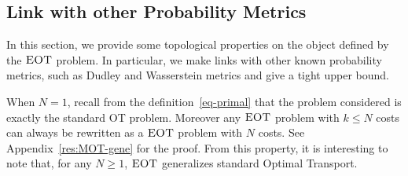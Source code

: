 
\subsection{Link with other Probability Metrics}
\label{sec:properties}
In this section, we provide some topological properties on the object defined by the $\textsc{EOT}$ problem. In particular, we make links with other known probability metrics, such as Dudley and Wasserstein metrics and give a tight upper bound. 
    
When $N=1$, recall from the definition~\eqref{eq-primal} that the problem considered is exactly the standard OT problem. Moreover any $\textsc{EOT}$ problem with $k\leq N$ costs can always be rewritten as a $\textsc{EOT}$ problem with $N$ costs. See Appendix~\ref{res:MOT-gene} for the proof. From this property, it is interesting to note that, for any $N\geq 1$, $\textsc{EOT}$ generalizes standard Optimal Transport.

